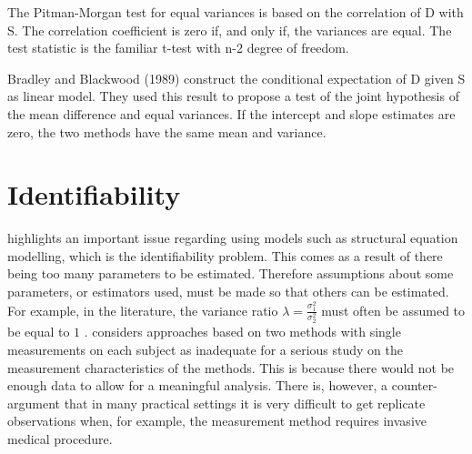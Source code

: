\documentclass[12pt, a4paper]{report}
\theoremstyle{plain}
\theoremstyle{definition}
\theoremstyle{remark}
\begin{document}
The Pitman-Morgan test for equal variances is based on the correlation of D with S. The correlation coefficient is zero if, and only if, the variances are equal. The test statistic is the familiar t-test with n-2 degree of freedom.

Bradley and Blackwood (1989) construct the conditional expectation of D given S as linear model.  They used this result to propose a test of the joint hypothesis of the mean difference and equal variances. 
If the intercept and slope estimates are zero, the two methods have the same mean and variance.






\section{Identifiability}
\citet{DunnSEME} highlights an important issue regarding using models such as structural equation modelling, which is the identifiability problem. This comes as a
result of there being too many parameters to be estimated. Therefore assumptions about some parameters, or estimators used, must be made so that others can be estimated. For example, in the literature, the variance ratio $\lambda=\frac{\sigma^{2}_{1}}{\sigma^{2}_{2}}$
must often be assumed to be equal to $1$ \citep{linnet98}. \citet{DunnSEME} considers approaches based on two methods with single measurements on each subject as inadequate for a serious
study on the measurement characteristics of the methods. This is because there would not be enough data to allow for a meaningful
analysis. There is, however, a counter-argument that in many practical settings it is very difficult to get replicate observations when, for example, the measurement method requires invasive medical
procedure.




\end{document}
